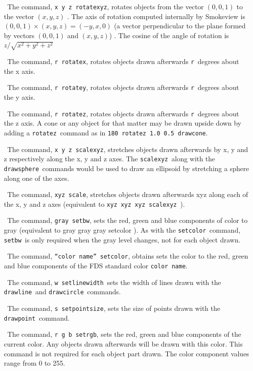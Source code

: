 \documentclass[11pt,twoside]{book}
\newcommand{\hitem}[1]{\item[{\bf #1} \hfill]}
\begin{document}
\hitem{rotatexyz}\ The command, {\tt x y z rotatexyz}, rotates objects from the
vector $(0,0,1)$ to the vector $(x,y,z)$ .  The
axis of rotation computed internally by Smokeview is $(0,0,1)\times
(x,y,z)=(-y,x,0)$ (a vector perpendicular to the plane formed by vectors
$(0,0,1)$ and $(x,y,z)$) . The cosine of the angle of rotation is $z/\sqrt{x^2+y^2+z^2}$

\hitem{rotatex}\ The command, {\tt r rotatex}, rotates objects drawn afterwards
{\tt r}\ degrees about the x axis.

\hitem{rotatey}\ The command, {\tt r rotatey}, rotates objects drawn afterwards
{\tt r}\ degrees about the y axis.

\hitem{rotatez}\ The command, {\tt r rotatez}, rotates objects drawn afterwards
{\tt r}\ degrees about the z axis.  A cone or any
object for that matter may be drawn upside down by adding a {\tt rotatez}\
command as in {\tt 180 rotatez 1.0 0.5 drawcone}.

\hitem{scalexyz}\ The command, {\tt x y z scalexyz}, stretches objects drawn
afterwards by x, y and z respectively along the x, y
and z axes. The {\tt scalexyz}\ along with the {\tt drawsphere}\ commands
would be used to draw an ellipsoid by stretching a sphere
along one of the axes.

\hitem{scale}\ The command, {\tt xyz scale}, stretches objects drawn afterwards
xyz along each of the x, y and z axes (equivalent
to {\tt xyz xyz xyz scalexyz}\ ).

\hitem{setbw}\ The command, {\tt gray setbw}, sets the red, green and blue components
of color to gray (equivalent to gray gray gray
setcolor ).  As with the {\tt setcolor}\ command, {\tt setbw}\ is only required when
the gray level changes, not for each object drawn.

\hitem{setcolor}\ The command, {\tt ``color name'' setcolor}, obtains sets the color
to the red, green and blue components of
the FDS standard color {\tt color~name}.

\hitem{setlinewidth}\ The command, {\tt w setlinewidth}\, sets the width of lines
drawn with the {\tt drawline}\ and {\tt drawcircle}\ commands.

\hitem{setpointsize}\ The command, {\tt s setpointsize}, sets the size of points
drawn with the {\tt drawpoint}\ command.

\hitem{setrgb}\ The command, {\tt r g b setrgb}, sets the red, green and blue
components of the current color.  Any objects drawn
afterwards will be drawn with this color. This command is not required for
each object part drawn. The color component values range from 0 to 255.
\end{document}
